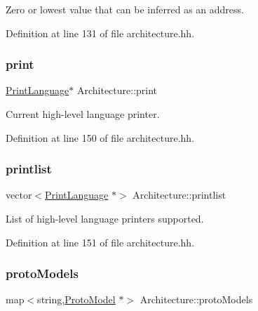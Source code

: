 Zero or lowest value that can be inferred as an address. 



Definition at line 131 of file architecture.\+hh.

\mbox{\label{class_architecture_af72890bc88edf8d6074e24d92fd31c57}} 
\subsubsection{\texorpdfstring{print}{print}}
{\footnotesize\ttfamily \mbox{\hyperlink{class_print_language}{Print\+Language}}$\ast$ Architecture\+::print}



Current high-\/level language printer. 



Definition at line 150 of file architecture.\+hh.

\mbox{\label{class_architecture_a118dbf145a9f2b6cae5d48b40f00e4d8}} 
\subsubsection{\texorpdfstring{printlist}{printlist}}
{\footnotesize\ttfamily vector$<$\mbox{\hyperlink{class_print_language}{Print\+Language}} $\ast$$>$ Architecture\+::printlist}



List of high-\/level language printers supported. 



Definition at line 151 of file architecture.\+hh.

\mbox{\label{class_architecture_ab15c8b7bbcb9408075014902da4f8687}} 
\subsubsection{\texorpdfstring{protoModels}{protoModels}}
{\footnotesize\ttfamily map$<$string,\mbox{\hyperlink{class_proto_model}{Proto\+Model}} $\ast$$>$ Architecture\+::proto\+Models}



